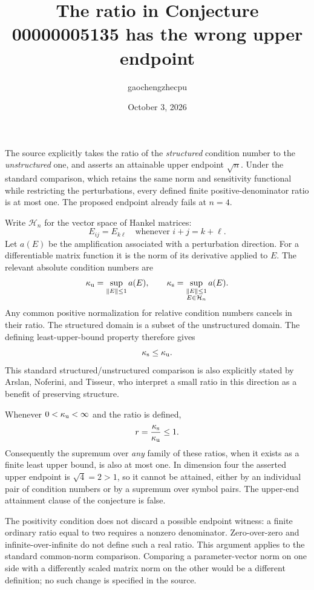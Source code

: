 \documentclass[11pt]{article}
\title{The ratio in Conjecture 00000005135 has the wrong upper endpoint}
\author{gaochengzhecpu}
\date{October 3, 2026}
\begin{document}
\maketitle

The source explicitly takes the ratio of the \emph{structured} condition
number to the \emph{unstructured} one, and asserts an attainable upper
endpoint $\sqrt n$. Under the standard comparison, which retains the same
norm and sensitivity functional while restricting the perturbations, every
defined finite positive-denominator ratio is at most one. The proposed
endpoint already fails at $n=4$.

Write $\mathcal H_n$ for the vector space of Hankel matrices:
\[
 E_{ij}=E_{k\ell}\quad\text{whenever }i+j=k+\ell.
\]
Let $a(E)$ be the amplification associated with a perturbation direction.
For a differentiable matrix function it is the norm of its derivative
applied to $E$. The relevant absolute condition numbers are
\[
 \kappa_{\rm u}=\sup_{\|E\|\leq1}a(E),\qquad
 \kappa_{\rm s}=\sup_{\substack{\|E\|\leq1\\E\in\mathcal H_n}}a(E).
\]
Any common positive normalization for relative condition numbers cancels
in their ratio. The structured domain is a subset of the unstructured
domain. The defining least-upper-bound property therefore gives
\[
 \kappa_{\rm s}\leq\kappa_{\rm u}.
\]
This standard structured/unstructured comparison is also explicitly stated
by Arslan, Noferini, and Tisseur\cite{ant}, who interpret a small ratio
in this direction as a benefit of preserving structure.

Whenever $0<\kappa_{\rm u}<\infty$ and the ratio is defined,
\[
 r=\frac{\kappa_{\rm s}}{\kappa_{\rm u}}\leq1.
\]
Consequently the supremum over \emph{any} family of these ratios, when
it exists as a finite least upper bound, is also at most one. In dimension
four the asserted upper endpoint is $\sqrt4=2>1$, so it cannot be attained,
either by an individual pair of condition numbers or by a supremum over
symbol pairs. The upper-end attainment clause of the conjecture is false.

The positivity condition does not discard a possible endpoint witness:
a finite ordinary ratio equal to two requires a nonzero denominator.
Zero-over-zero and infinite-over-infinite do not define such a real ratio.
This argument applies to the standard common-norm comparison. Comparing
a parameter-vector norm on one side with a differently scaled matrix norm
on the other would be a different definition; no such change is specified
in the source.
\end{document}
